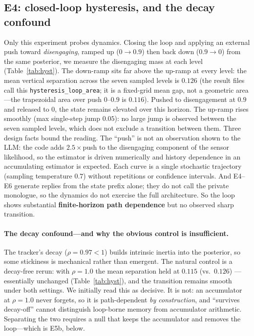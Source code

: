 \documentclass[11pt]{article}
\begin{document}
\subsection{E4: closed-loop hysteresis, and the decay confound}
Only this experiment probes dynamics. Closing the loop and applying an external
push toward \emph{disengaging}, ramped up ($0\to0.9$) then back down
($0.9\to0$) from the same posterior, we measure the disengaging mass at each
level (Table~\ref{tab:hyst}). The down-ramp sits far above the up-ramp at every
level: the mean vertical separation across the seven sampled levels is $0.126$
(the result files call this \texttt{hysteresis\_loop\_area}; it is a fixed-grid
mean gap, not a geometric area---the trapezoidal area over push $0$--$0.9$ is
$0.116$). Pushed to disengagement at $0.9$ and released to $0$, the state
remains elevated over this horizon. The up-ramp rises smoothly (max single-step
jump $0.05$): no large jump is observed between the seven sampled levels, which
does not exclude a transition between them. Three design facts bound the
reading. The ``push'' is not an observation shown to the LLM: the code adds
$2.5\times$push to the disengaging component of the sensor likelihood, so the
estimator is driven numerically and history dependence in an accumulating
estimator is expected. Each curve is a single stochastic trajectory (sampling
temperature $0.7$) without repetitions or confidence intervals. And E4--E6
generate replies from the state prefix alone; they do not call the private
monologue, so the dynamics do not exercise the full architecture. So the loop
shows substantial \textbf{finite-horizon path dependence} but no observed sharp
transition.

\paragraph{The decay confound---and why the obvious control is insufficient.}
The tracker's decay ($\rho=0.97<1$) builds intrinsic inertia into the posterior,
so some stickiness is mechanical rather than emergent. The natural control is a
decay-free rerun: with $\rho=1.0$ the mean separation held at $0.115$ (vs.\ $0.126$)
---essentially unchanged (Table~\ref{tab:hyst}), and the transition remains
smooth under both settings. We initially read this as decisive. It is not: an
accumulator at $\rho=1.0$ never forgets, so it is path-dependent \emph{by
construction}, and ``survives decay-off'' cannot distinguish loop-borne memory
from accumulator arithmetic. Separating the two requires a null that keeps the
accumulator and removes the loop---which is E5b, below.
\end{document}
